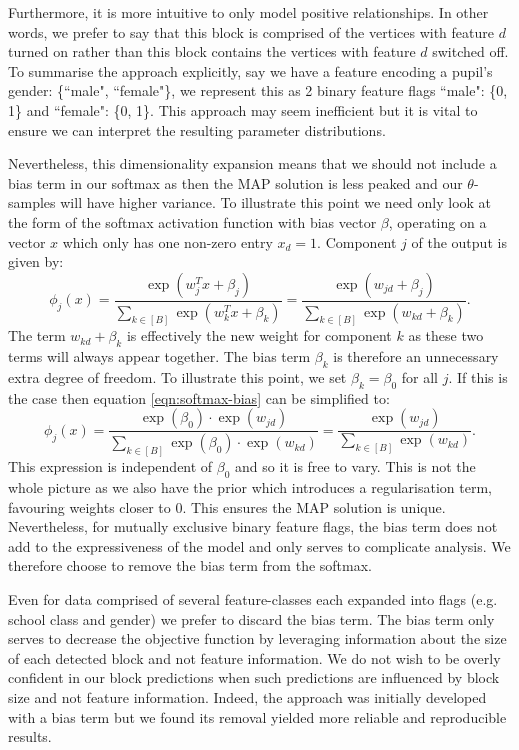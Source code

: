 Furthermore, it is more intuitive to only model positive relationships. In other words, we prefer to say that this block is comprised of the vertices with feature $d$ turned on rather than this block contains the vertices with feature $d$ switched off. To summarise the approach explicitly, say we have a feature encoding a pupil's gender: \{``male", ``female"\}, we represent this as 2 binary feature flags ``male": \{0, 1\} and ``female": \{0, 1\}. This approach may seem inefficient but it is vital to ensure we can interpret the resulting parameter distributions.

Nevertheless, this dimensionality expansion means that we should not include a bias term in our softmax as then the MAP solution is less peaked and our $\theta$-samples will have higher variance. To illustrate this point we need only look at the form of the softmax activation function with bias vector $\beta$, operating on a vector $x$ which only has one non-zero entry $x_d=1$. Component $j$ of the output is given by:
%
\begin{equation}
	\phi_j(x) = \frac{\exp(w_j^T x + \beta_j)}{\sum_{k \in [B]} \exp(w_k^T x + \beta_k)} = 
	\frac{\exp(w_{jd} + \beta_j)}{\sum_{k \in [B]} \exp({w_{kd} + \beta_k})}.
	\label{eqn:softmax-bias}
\end{equation}
%
The term $w_{kd} + \beta_k$ is effectively the new weight for component $k$ as these two terms will always appear together. The bias term $\beta_k$ is therefore an unnecessary extra degree of freedom. To illustrate this point, we set $\beta_k=\beta_0$ for all $j$. If this is the case then equation \ref{eqn:softmax-bias} can be simplified to:
%
\begin{equation}
	\phi_j(x) = \frac{\exp(\beta_0) \cdot \exp(w_{jd})}{\sum_{k \in [B]} \exp(\beta_0) \cdot \exp(w_{kd})}
	= \frac{\exp(w_{jd})}{\sum_{k \in [B]} \exp(w_{kd})}.
\end{equation}
%
This expression is independent of $\beta_0$ and so it is free to vary. This is not the whole picture as we also have the prior which introduces a regularisation term, favouring weights closer to 0. This ensures the MAP solution is unique. Nevertheless, for mutually exclusive binary feature flags, the bias term does not add to the expressiveness of the model and only serves to complicate analysis. We therefore choose to remove the bias term from the softmax.

Even for data comprised of several feature-classes each expanded into flags (e.g. school class and gender) we prefer to discard the bias term. The bias term only serves to decrease the objective function by leveraging information about the size of each detected block and not feature information. We do not wish to be overly confident in our block predictions when such predictions are influenced by block size and not feature information. Indeed, the approach was initially developed with a bias term but we found its removal yielded more reliable and reproducible results.
\clearpage

